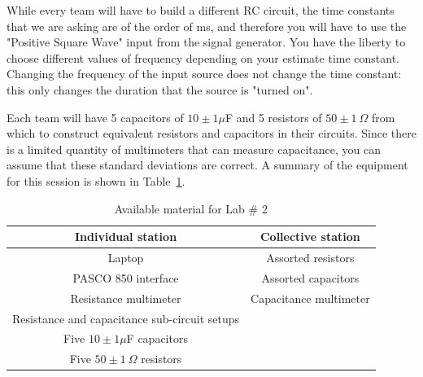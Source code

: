\documentclass[12pt]{report}
\def\anhkhoi#1{{\color{purple}[#1]}}
\begin{document}
While every team will have to build a different RC circuit, the time constants that we are asking are of the order of ms, and therefore you will have to use the "Positive Square Wave" input from the signal generator. 
You have the liberty to choose different values of frequency depending on your estimate time constant. 
Changing the frequency of the input source does not change the time constant: this only changes the duration that the source is "turned on".

%
%

Each team will have 5 capacitors of $10\pm 1\mu$F and 5 resistors of $50\pm 1 \ \Omega$ from which to construct equivalent resistors and capacitors in their circuits. Since there is a limited quantity of multimeters that can measure capacitance, you can assume that these standard deviations are correct.
A summary of the equipment for this session is shown in Table~\ref{Tab:Lab2-material}.
\begin{table}[h]
\centering
\begin{tabular}{||c | c ||}
\hline
Individual station & Collective station\\ \hline
Laptop & Assorted resistors \\
PASCO 850 interface & Assorted capacitors \\
Resistance multimeter & Capacitance multimeter \\
Resistance and capacitance sub-circuit setups & \\
Five $10\pm 1 \mu$F capacitors & \\
Five $50 \pm 1 \ \Omega$ resistors &  \\
\hline
\end{tabular}
\caption{Available material for Lab \# 2}
\label{Tab:Lab2-material}
\end{table}
\end{document}
